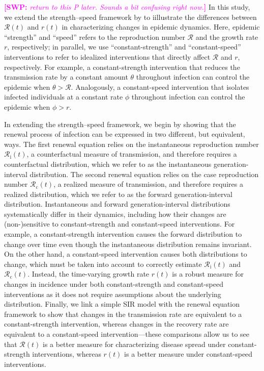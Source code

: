 \documentclass[12pt]{article}
\newcommand{\comment}{\showcomment}
\newcommand{\showcomment}[3]{\textcolor{#1}{\textbf{[#2: }\textsl{#3}\textbf{]}}}
\newcommand{\swp}[1]{\comment{magenta}{SWP}{#1}}
\newcommand{\Rx}[1]{\ensuremath{{\mathcal R}_{#1}}\xspace}
\newcommand{\Rc}{\Rx{\mathrm{c}}}
\newcommand{\Ri}{\Rx{\mathrm{i}}}
\newcommand{\RR}{\ensuremath{{\mathcal R}}\xspace}
\begin{document}
\swp{return to this P later. Sounds a bit confusing right now.}
In this study, we extend the strength--speed framework by \cite{dushoff2021speed} to iillustrate the differences between $\RR(t)$ and $r(t)$ in characterizing changes in epidemic dynamics.
Here, epidemic ``strength'' and ``speed'' refers to the reproduction number $\RR$ and the growth rate $r$, respectively; 
in parallel, we use ``constant-strength'' and ``constant-speed'' interventions to refer to idealized interventions that directly affect $\RR$ and $r$, respectively. 
For example, a constant-strength intervention that reduces the transmission rate by a constant amount $\theta$ throughout infection can control the epidemic when $\theta > \RR$. 
Analogously, a constant-speed intervention that isolates infected individuals at a constant rate $\phi$ throughout infection can control the epidemic when $\phi > r$.

In extending the strength--speed framework, we begin by showing that the renewal process of infection can be expressed in two different, but equivalent, ways.
The first renewal equation relies on the instantaneous reproduction number $\Ri(t)$, a counterfactual measure of transmission, and therefore requires a counterfactual distribution, which we refer to as the instantaneous generation-interval distribution.
The second renewal equation relies on the case reproduction number $\Rc(t)$, a realized measure of transmission, and therefore requires a realized distribution, which we refer to as the forward generation-interval distribution.
Instantaneous and forward generation-interval distributions systematically differ in their dynamics, including how their changes are (non-)sensitive to constant-strength and constant-speed interventions.
For example, a constant-strength intervention causes the forward distribution to change over time even though the instantaneous distribution remains invariant.
On the other hand, a constant-speed intervention causes both distributions to change, which must be taken into account to correctly estimate $\Ri(t)$ and $\Rc(t)$.
Instead, the time-varying growth rate $r(t)$ is a robust measure for changes in incidence under both constant-strength and constant-speed interventions as it does not require assumptions about the underlying distribution.
Finally, we link a simple SIR model with the renewal equation framework to show that changes in the transmission rate are equivalent to a constant-strength intervention, whereas changes in the recovery rate are equivalent to a constant-speed intervention---these comparisons allow us to see that $\RR(t)$ is a better measure for characterizing disease spread under constant-strength interventions, whereas $r(t)$ is a better measure under constant-speed interventions.
\end{document}
